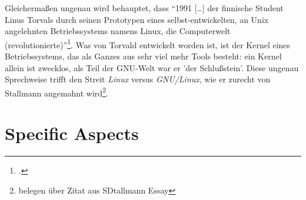 \documentclass[DIV=calc,BCOR=5mm,11pt,headings=small,oneside,abstract=true, toc=bib]{scrartcl}
\begin{document}
Gleichermaßen ungenau wird behauptet, dass \enquote{1991 [\ldots] der
finnische Student Linus Torvals durch seinen Prototypen eines
selbst-entwickelten, an Unix angelehnten Betriebssystems namens Linux,
die Computerwelt (revolutionierte)}\footcite[13][]{SeeKra2008a}. Was von
Torvald entwickelt worden ist, ist der Kernel eines Betriebssystems, das als
Ganzes aus sehr viel mehr Tools besteht: ein Kernel allein ist zwecklos, als
Teil der GNU-Welt war er 'der Schlußstein'. Diese ungenau Sprechweise trifft den
Streit \textit{Linux} versus \textit{GNU/Linux}, wie er zurecht von Stallmann angemahnt
wird\footnote{belegen über Zitat aus SDtallmann Essay}.
\section{Specific Aspects}

\small

\end{document}
